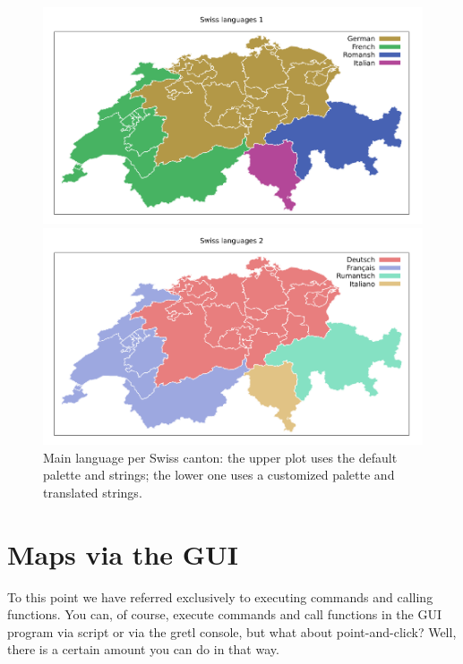 \documentclass{article}
\begin{document}
\begin{figure}[htbp]
  \begin{center}
  \includegraphics[scale=0.7]{swiss_langs1.pdf}

  \includegraphics[scale=0.7]{swiss_langs2.pdf}
\end{center}
\caption{Main language per Swiss canton: the upper plot uses the
  default palette and strings; the lower one uses a customized palette
  and translated strings.}
\label{fig:swiss}
\end{figure}

\section{Maps via the GUI}
\label{sec:gui}

To this point we have referred exclusively to executing commands and
calling functions. You can, of course, execute commands and call
functions in the GUI program via script or via the gretl console, but
what about point-and-click? Well, there is a certain amount you can do
in that way.
\end{document}
